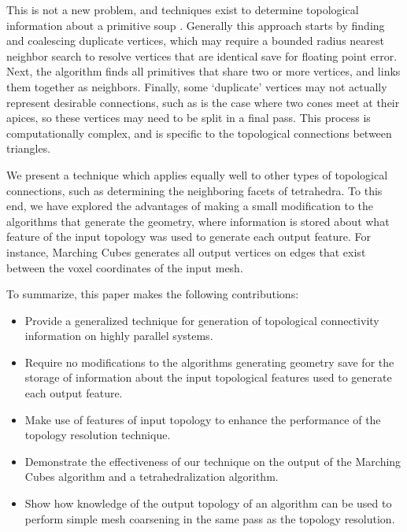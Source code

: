 \documentclass[review,journal]{vgtc}         %
\begin{document}
This is not a new problem, and techniques exist to determine topological
information about a primitive soup \cite{Park}. Generally this approach starts by finding 
and coalescing duplicate vertices, which may require a bounded radius nearest neighbor search to 
resolve vertices that are identical save for floating point error. Next, the algorithm finds all primitives that 
share two or more vertices, and links them together as neighbors. Finally,
some `duplicate' vertices may not actually represent desirable connections,
such as is the case where two cones meet at their apices, so these vertices
may need to be split in a final pass. This process is computationally complex, and is
specific to the topological connections between triangles. 

We present a technique which applies equally well to other types of topological 
connections, such as determining the neighboring facets of tetrahedra. To this end, we have
explored the advantages of making a small modification to the algorithms that generate the
geometry, where information is stored about what feature of the input topology was used to generate
each output feature. For instance, Marching Cubes generates all output vertices on edges that
exist between the voxel coordinates of the input mesh.

\noindent
\begin{minipage}{\linewidth}
To summarize, this paper makes the following contributions:
\begin{itemize}
	\item{Provide a generalized technique for generation of topological connectivity information on highly parallel systems.}
	\item{Require no modifications to the algorithms generating geometry save for the
		storage of information about the input topological features used to generate each output feature.}

	\item{Make use of features of input topology to enhance the performance of the topology
		resolution technique.}

	\item{Demonstrate the effectiveness of our technique on the output of the Marching Cubes
		algorithm and a tetrahedralization algorithm.}
 
	\item{Show how knowledge of the output topology of an algorithm can be used to perform
		 simple mesh coarsening in the same pass as the topology resolution.}
 
\end{itemize}
\end{minipage}
\end{document}
